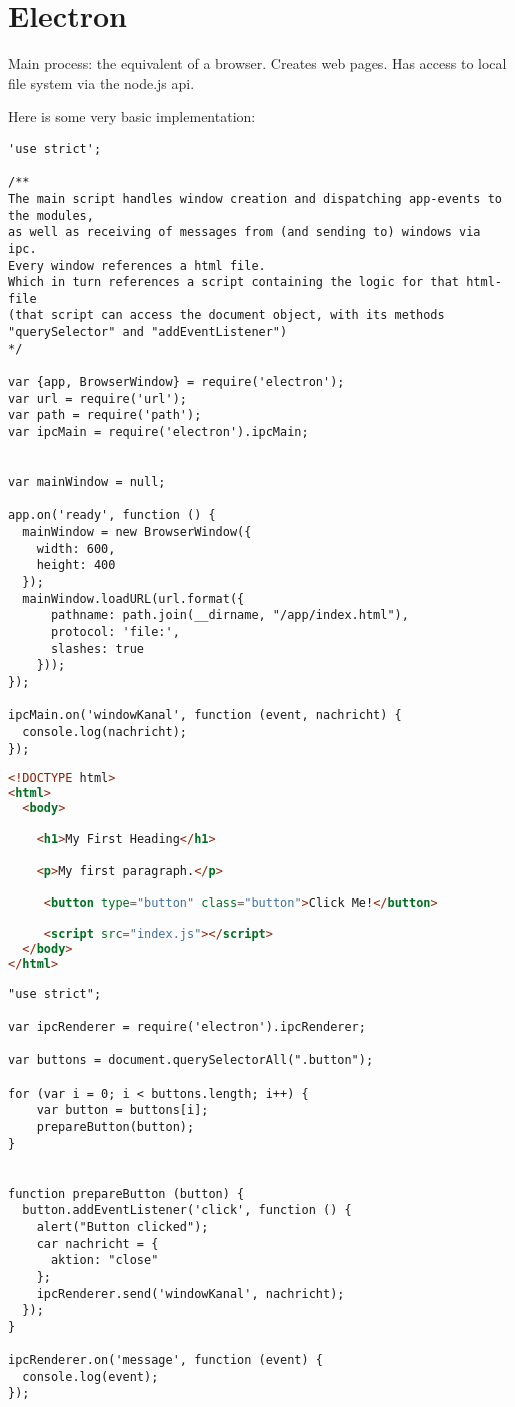 \section{Electron}

Main process: the equivalent of a browser. Creates web pages. Has access to local file system via the node.js api.

Here is some very basic implementation: 

\begin{lstlisting}
'use strict';

/**
The main script handles window creation and dispatching app-events to the modules,
as well as receiving of messages from (and sending to) windows via ipc.
Every window references a html file.
Which in turn references a script containing the logic for that html-file
(that script can access the document object, with its methods "querySelector" and "addEventListener")
*/

var {app, BrowserWindow} = require('electron');
var url = require('url');
var path = require('path');
var ipcMain = require('electron').ipcMain;


var mainWindow = null;

app.on('ready', function () {
  mainWindow = new BrowserWindow({
    width: 600,
    height: 400
  });
  mainWindow.loadURL(url.format({
      pathname: path.join(__dirname, "/app/index.html"),
      protocol: 'file:',
      slashes: true
    }));
});

ipcMain.on('windowKanal', function (event, nachricht) {
  console.log(nachricht);
});

\end{lstlisting}

\begin{lstlisting}[language=html]
<!DOCTYPE html>
<html>
  <body>

    <h1>My First Heading</h1>

    <p>My first paragraph.</p>

     <button type="button" class="button">Click Me!</button>

     <script src="index.js"></script>
  </body>
</html>

\end{lstlisting}

\begin{lstlisting}
"use strict";

var ipcRenderer = require('electron').ipcRenderer;

var buttons = document.querySelectorAll(".button");

for (var i = 0; i < buttons.length; i++) {
    var button = buttons[i];
    prepareButton(button);
}


function prepareButton (button) {
  button.addEventListener('click', function () {
    alert("Button clicked");
    car nachricht = {
      aktion: "close"
    };
    ipcRenderer.send('windowKanal', nachricht);
  });
}

ipcRenderer.on('message', function (event) {
  console.log(event);
});
\end{lstlisting}

